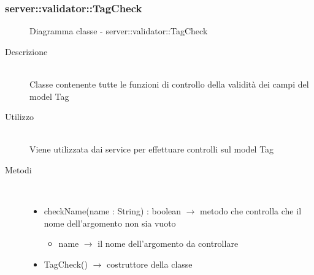 \vspace{0.5cm}
\hypertarget{server::validator::TagCheck}{}
\subsubsection[TagCheck]{server::validator::TagCheck}
\begin{figure}[H]
	\centering
	\caption{Diagramma classe - server::validator::TagCheck}
\end{figure}\begin{description}
\item[Descrizione] \hfill \\
Classe contenente tutte le funzioni di controllo della validità dei campi del model Tag
\item[Utilizzo] \hfill \\
Viene utilizzata dai service per effettuare controlli sul model Tag
\item[Metodi] \hfill \\
\vspace{-7mm}
\begin{itemize}
	\item checkName(name : String) : boolean $\rightarrow$ metodo che controlla che il nome dell'argomento non sia vuoto\begin{itemize}
		\item name $\rightarrow$ il nome dell'argomento da controllare
	\end{itemize}
	
	\item TagCheck() $\rightarrow$ costruttore della classe
\end{itemize}

\end{description}

\vspace{0.5cm}
\hypertarget{server::validator::QuestionCheck}{}
